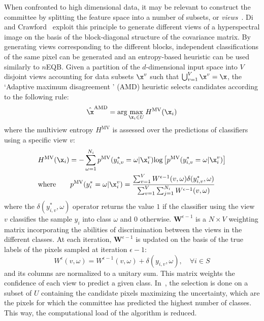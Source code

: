 When confronted to high dimensional data, it may be relevant to construct the committee by splitting the feature space into a number of subsets, or \emph{views}~. Di and Crawford~ exploit this principle to generate different views of a hyperspectral image on the basis of the block-diagonal structure of the covariance matrix. By generating views corresponding to the different blocks, independent classifications of the same pixel can be generated and an entropy-based heuristic can be used similarly to $n$EQB.
Given a partition of the $d$-dimensional input space into $V$ disjoint views accounting for data subsets $\x^v$ such that $\bigcup_{v=1}^V \x^v = \x $, the `Adaptive maximum disagreement ' (AMD) heuristic selects candidates according to the following rule:
\begin{equation}
	\hat{\x}^{\text{AMD}} = \arg\max_{\x_i \in U} H^{\text{MV}}(\x_i)
	\label{eq:AMD}
\end{equation}
where the multiview entropy $H^{\text{MV}}$ is assessed over the predictions of classifiers using a specific view $v$:
\begin{align}
	&H^{\text{MV}}(\x_i) =  -\sum_{\omega=1}^{N_i} p^{\text{MV}}(y^*_{i,v} = \omega|\x^v_i) \mbox{log}\left[p^{\text{MV}}(y^*_{i,v}= \omega|\x^v_i)\right]\\
	& \text{where} \qquad p^{\text{MV}}(y^*_i = \omega|\x^v_i) = \frac{\sum_{v=1}^V W^{\epsilon-1}(v,\omega) \delta(y^*_{i,v}, \omega )}{\sum_{v=1}^V\sum_{j = 1}^{N_i} W^{\epsilon-1}(v,\omega)} \nonumber
\label{eq:MVentr}
\end{align}
where the $\delta(y_{i,v}^*,\omega )$ operator returns the value $1$ if the classifier using the view $v$ classifies the sample $y_i$ into class $\omega$ and $0$ otherwise. $\mathbf{W}^{\epsilon-1}$ is a $N \times V$ weighting matrix incorporating the abilities of discrimination between the views in the different classes. At each iteration, $\mathbf{W}^{\epsilon-1}$ is updated on the basis of the true labels of the pixels sampled at iteration $\epsilon-1$:
\begin{equation}
W^\epsilon(v,\omega) = W^{\epsilon-1}(v,\omega)+\delta(y_{i,v},\omega ), \quad \forall i \in S
\label{eq:W}
\end{equation}
and its columns are normalized to a unitary sum. This matrix weights the confidence of each view to predict a given class. In~, the selection is done on a  subset of $U$ containing the candidate pixels maximizing the uncertainty, which are the pixels for which  the committee has predicted the highest number of classes. This way, the computational load of the algorithm is reduced.

